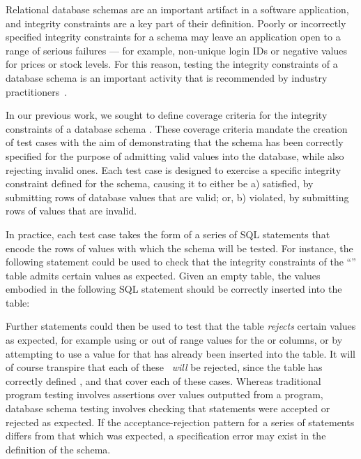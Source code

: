 Relational database schemas are an important artifact in a software application, and integrity constraints are a key part of their definition. Poorly or incorrectly specified integrity constraints for a schema may leave an application open to a range of serious failures --- for example, non-unique login IDs or negative values for prices or stock levels. For this reason, testing the integrity constraints of a database schema is an important activity that is recommended by industry practitioners~\cite{DzoneDatabaseTesting}.

In our previous work, we sought to define coverage criteria for the integrity constraints of a database schema \cite{McMinn2015}. These coverage criteria mandate the creation of test cases with the aim of demonstrating that the schema has been correctly specified for the purpose of admitting valid values into the database, while also rejecting \mbox{invalid} ones. Each test case is designed to exercise a specific integrity constraint defined for the schema, causing it to either be a) satisfied, by submitting rows of database values that are valid; or, b) violated, by submitting rows of values that are invalid.

In practice, each test case takes the form of a series of SQL \INSERT statements that encode the rows of values with which the schema will be tested. For instance, the following \INSERT statement could be used to check that the integrity constraints of the ``'' table admits certain values as expected. Given an empty table, the values embodied in the following SQL statement should be correctly inserted into the table:

\vspace{-.25em}
\begin{center}
\end{center}
\vspace{-.25em}

\begin{sloppypar}
Further \INSERT statements could then be used to test that the table {\it rejects} certain values as expected, for example using \NULL or out of range values for the  or  columns, or by attempting to use a value for  that has already been inserted into the table.
%
It will of course transpire that each of these \INSERTs~{\it will} be rejected, since the table has correctly defined \NOTNULL, \CHECK and \PKCs that cover each of these cases.
%
Whereas traditional program testing involves assertions over values outputted from a program, database schema testing involves checking that \INSERT statements were accepted or rejected as expected. If the acceptance-rejection pattern for a series of \INSERT statements differs from that which was expected, a specification error may exist in the definition of the schema.
\end{sloppypar}

